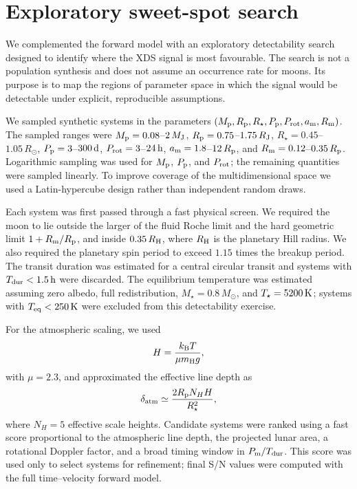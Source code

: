 \appendix
\section{Exploratory sweet-spot search}
\label{app:sweetspot}

We complemented the forward model with an exploratory detectability search
designed to identify where the XDS signal is most favourable.  The search is
not a population synthesis and does not assume an occurrence rate for moons.
Its purpose is to map the regions of parameter space in which the signal would
be detectable under explicit, reproducible assumptions.

We sampled synthetic systems in the parameters
$(M_{\rm p},R_{\rm p},R_\star,P_{\rm p},P_{\rm rot},a_{\rm m},R_{\rm m})$.
The sampled ranges were
$M_{\rm p}=0.08$--$2\,M_{\rm J}$,
$R_{\rm p}=0.75$--$1.75\,R_{\rm J}$,
$R_\star=0.45$--$1.05\,R_\odot$,
$P_{\rm p}=3$--$300\,{\rm d}$,
$P_{\rm rot}=3$--$24\,{\rm h}$,
$a_{\rm m}=1.8$--$12\,R_{\rm p}$, and
$R_{\rm m}=0.12$--$0.35\,R_{\rm p}$.  Logarithmic sampling was used for
$M_{\rm p}$, $P_{\rm p}$, and $P_{\rm rot}$; the remaining quantities were
sampled linearly.  To improve coverage of the multidimensional space we used a
Latin-hypercube design rather than independent random draws.

Each system was first passed through a fast physical screen.  We required the
moon to lie outside the larger of the fluid Roche limit and the hard geometric
limit $1+R_{\rm m}/R_{\rm p}$, and inside $0.35\,R_{\rm H}$, where
$R_{\rm H}$ is the planetary Hill radius.  We also required the planetary spin
period to exceed $1.15$ times the breakup period.  The transit duration was
estimated for a central circular transit and systems with
$T_{\rm dur}<1.5\,{\rm h}$ were discarded.  The equilibrium temperature was
estimated assuming zero albedo, full redistribution, $M_\star=0.8\,M_\odot$,
and $T_\star=5200\,{\rm K}$; systems with $T_{\rm eq}<250\,{\rm K}$ were
excluded from this detectability exercise.

For the atmospheric scaling, we used
\begin{equation}
H=\frac{k_{\rm B}T}{\mu m_{\rm H}g},
\end{equation}
with $\mu=2.3$, and approximated the effective line depth as
\begin{equation}
\delta_{\rm atm}\simeq
\frac{2R_{\rm p}N_HH}{R_\star^2},
\end{equation}
where $N_H=5$ effective scale heights.  Candidate systems were ranked using a
fast score proportional to the atmospheric line depth, the projected lunar
area, a rotational Doppler factor, and a broad timing window in
$P_{\rm m}/T_{\rm dur}$.  This score was used only to select systems for
refinement; final S/N values were computed with the full time--velocity forward
model.

